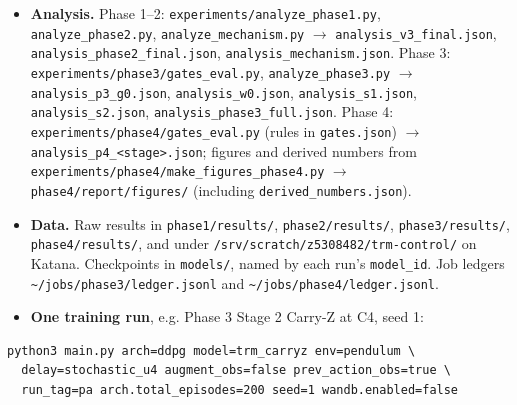 \documentclass[11pt]{article}
\begin{document}
\begin{itemize}
\item \textbf{Analysis.} Phase 1--2: \texttt{experiments/\allowbreak{}analyze\_\allowbreak{}phase1.\allowbreak{}py}, \texttt{analyze\_\allowbreak{}phase2.\allowbreak{}py}, \texttt{analyze\_\allowbreak{}mechanism.\allowbreak{}py} $\rightarrow$ \texttt{analysis\_\allowbreak{}v3\_\allowbreak{}final.\allowbreak{}json}, \texttt{analysis\_\allowbreak{}phase2\_\allowbreak{}final.\allowbreak{}json}, \texttt{analysis\_\allowbreak{}mechanism.\allowbreak{}json}. Phase 3: \texttt{experiments/\allowbreak{}phase3/\allowbreak{}gates\_\allowbreak{}eval.\allowbreak{}py}, \texttt{analyze\_\allowbreak{}phase3.\allowbreak{}py} $\rightarrow$ \texttt{analysis\_\allowbreak{}p3\_\allowbreak{}g0.\allowbreak{}json}, \texttt{analysis\_\allowbreak{}w0.\allowbreak{}json}, \texttt{analysis\_\allowbreak{}s1.\allowbreak{}json}, \texttt{analysis\_\allowbreak{}s2.\allowbreak{}json}, \texttt{analysis\_\allowbreak{}phase3\_\allowbreak{}full.\allowbreak{}json}. Phase 4: \texttt{experiments/\allowbreak{}phase4/\allowbreak{}gates\_\allowbreak{}eval.\allowbreak{}py} (rules in \texttt{gates.json}) $\rightarrow$ \texttt{analysis\_\allowbreak{}p4\_\allowbreak{}<stage>.\allowbreak{}json}; figures and derived numbers from \texttt{experiments/\allowbreak{}phase4/\allowbreak{}make\_\allowbreak{}figures\_\allowbreak{}phase4.\allowbreak{}py} $\rightarrow$ \texttt{phase4/\allowbreak{}report/\allowbreak{}figures/\allowbreak{}} (including \texttt{derived\_\allowbreak{}numbers.\allowbreak{}json}).
\item \textbf{Data.} Raw results in \texttt{phase1/\allowbreak{}results/\allowbreak{}}, \texttt{phase2/\allowbreak{}results/\allowbreak{}}, \texttt{phase3/\allowbreak{}results/\allowbreak{}}, \texttt{phase4/\allowbreak{}results/\allowbreak{}}, and under \texttt{/\allowbreak{}srv/\allowbreak{}scratch/\allowbreak{}z5308482/\allowbreak{}trm-control/\allowbreak{}} on Katana. Checkpoints in \texttt{models/}, named by each run's \texttt{model\_id}. Job ledgers \texttt{\textasciitilde{}/\allowbreak{}jobs/\allowbreak{}phase3/\allowbreak{}ledger.\allowbreak{}jsonl} and \texttt{\textasciitilde{}/\allowbreak{}jobs/\allowbreak{}phase4/\allowbreak{}ledger.\allowbreak{}jsonl}.
\item \textbf{One training run}, e.g. Phase 3 Stage 2 Carry-Z at C4, seed 1:
\end{itemize}



{\small\begin{verbatim}
python3 main.py arch=ddpg model=trm_carryz env=pendulum \
  delay=stochastic_u4 augment_obs=false prev_action_obs=true \
  run_tag=pa arch.total_episodes=200 seed=1 wandb.enabled=false
\end{verbatim}}
\end{document}
